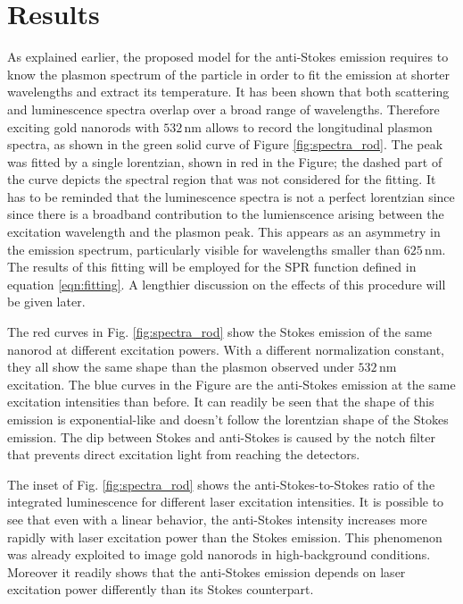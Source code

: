 \documentclass[journal=nalefd,manuscript=letter]{achemso}
\newcommand{\nm}{\ensuremath{\,\textrm{nm}}}
\begin{document}
\section{Results}
As explained earlier, the proposed model for the anti-Stokes emission requires
to know the plasmon spectrum of the particle in order to fit the emission at
shorter wavelengths and extract its temperature. It has been shown that both
scattering and luminescence spectra overlap over a broad range of wavelengths.
Therefore exciting gold nanorods with $532\nm$ allows to record the longitudinal
plasmon spectra, as shown in the green solid curve of Figure
\ref{fig:spectra_rod}. The peak was fitted by a single lorentzian, shown in red
in the Figure; the dashed part of the curve depicts the spectral region that was
not considered for the fitting. It has to be reminded that the luminescence
spectra is not a perfect lorentzian since since there is a broadband
contribution to the lumienscence arising between the excitation wavelength and
the plasmon peak. This appears as an asymmetry in the emission spectrum,
particularly visible for wavelengths smaller than $625\nm$. The results of this
fitting will be employed for the SPR function defined in equation
\ref{eqn:fitting}. A lengthier discussion on the effects of this procedure will
be given later.

The red curves in Fig. \ref{fig:spectra_rod} show the Stokes emission of the
same nanorod at different excitation powers. With a different normalization
constant, they all show the same shape than the plasmon observed under $532\nm$
excitation. The blue curves in the Figure are the anti-Stokes emission at the
same excitation intensities than before. It can readily be seen that the shape
of this emission is exponential-like and doesn't follow the lorentzian shape of
the Stokes emission. The dip between Stokes and anti-Stokes is caused by the
notch filter that prevents direct excitation light from reaching the detectors.

The inset of Fig. \ref{fig:spectra_rod} shows the anti-Stokes-to-Stokes ratio of
the integrated luminescence for different laser excitation intensities. It is
possible to see that even with a linear behavior, the anti-Stokes intensity
increases more rapidly with laser excitation power than the Stokes emission.
This phenomenon was already exploited to image gold nanorods in high-background
conditions. Moreover it readily shows that the anti-Stokes emission depends on
laser excitation power differently than its Stokes counterpart. 
\end{document}
